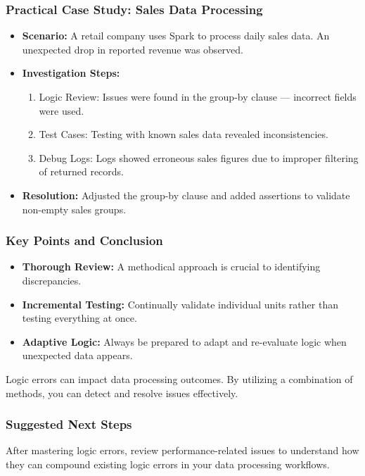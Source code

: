 \documentclass[aspectratio=169]{beamer}
\begin{document}
\begin{frame}[fragile]
    \frametitle{Practical Case Study: Sales Data Processing}
    \begin{itemize}
        \item \textbf{Scenario:} A retail company uses Spark to process daily sales data. An unexpected drop in reported revenue was observed.
        \item \textbf{Investigation Steps:}
        \begin{enumerate}
            \item Logic Review: Issues were found in the group-by clause — incorrect fields were used.
            \item Test Cases: Testing with known sales data revealed inconsistencies.
            \item Debug Logs: Logs showed erroneous sales figures due to improper filtering of returned records.
        \end{enumerate}
        \item \textbf{Resolution:} Adjusted the group-by clause and added assertions to validate non-empty sales groups.
    \end{itemize}
\end{frame}

\begin{frame}[fragile]
    \frametitle{Key Points and Conclusion}
    \begin{itemize}
        \item \textbf{Thorough Review:} A methodical approach is crucial to identifying discrepancies.
        \item \textbf{Incremental Testing:} Continually validate individual units rather than testing everything at once.
        \item \textbf{Adaptive Logic:} Always be prepared to adapt and re-evaluate logic when unexpected data appears.
    \end{itemize}
    \vspace{1em}
    Logic errors can impact data processing outcomes. By utilizing a combination of methods, you can detect and resolve issues effectively.
\end{frame}

\begin{frame}[fragile]
    \frametitle{Suggested Next Steps}
    After mastering logic errors, review performance-related issues to understand how they can compound existing logic errors in your data processing workflows.
\end{frame}
\end{document}
